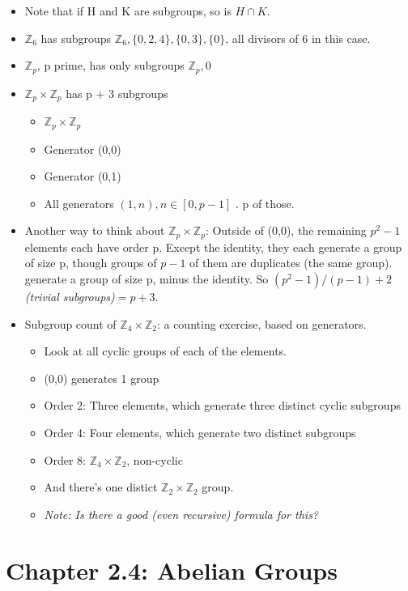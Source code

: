 \documentclass[11pt, oneside]{article}   	%
\begin{document}
\begin {itemize} 
\item Note that if H and K are subgroups, so is $H \cap K$.
\item $\mathbb{Z}_6$ has subgroups $\mathbb{Z}_6, \{0, 2, 4\}, \{0, 3\}, \{0\}$, all divisors of 6 in this case.
\item $\mathbb{Z}_p$, p prime, has only subgroups $\mathbb{Z}_p, {0}$
\item $\mathbb{Z}_p \times \mathbb{Z}_p$ has p + 3 subgroups 
  \begin{itemize}
  \item $\mathbb{Z}_p \times \mathbb{Z}_p$
  \item Generator (0,0)
  \item Generator (0,1)
  \item All generators $(1, n), n \in [0, p-1]$ . p of those.
  \end {itemize} 
\item Another way to think about  $\mathbb{Z}_p \times \mathbb{Z}_p$: Outside of (0,0), the remaining $p^2-1$ elements each have order p.  Except the identity, they each generate a group of size p, though groups of $p-1$ of them are duplicates (the same group). generate a group of size p, minus the identity.  So $(p^2-1)/(p-1) + 2$ \emph{(trivial subgroups)}$  = p+3.$
\item Subgroup count of $\mathbb{Z}_4 \times \mathbb{Z}_2$: a counting exercise, based on generators. 
\begin{itemize}
\item Look at all cyclic groups of each of the elements.
\item (0,0) generates 1 group
\item Order 2: Three elements, which generate three distinct cyclic subgroups
\item Order 4: Four elements, which generate two distinct subgroups
\item Order 8: $\mathbb{Z}_4 \times \mathbb{Z}_2$, non-cyclic
\item And there's one distict $\mathbb{Z}_2 \times \mathbb{Z}_2$ group.
\item \emph{Note: Is there a good (even recursive) formula for this?}
\end {itemize} 

\end {itemize} 

\section {Chapter 2.4: Abelian Groups}
\end{document}
